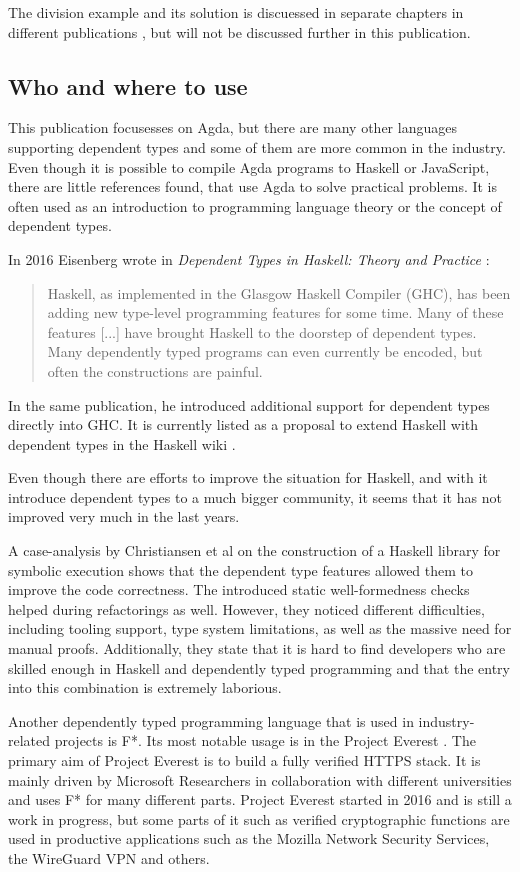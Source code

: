 The division example and its solution is discuessed in separate chapters in different publications \cite{10.1145/2841316, Bove2009}, but will not be discussed further in this publication.

\subsection{Who and where to use}
This publication focusesses on Agda, but there are many other languages supporting dependent types and some of them are more common in the industry.
Even though it is possible to compile Agda programs to Haskell or JavaScript, there are little references found, that use Agda to solve practical problems.
It is often used as an introduction to programming language theory or the concept of dependent types.

In 2016 Eisenberg wrote in \emph{Dependent Types in Haskell: Theory and Practice} \cite{DBLP:journals/corr/Eisenberg16}: 
\begin{quote}
Haskell, as implemented in the Glasgow Haskell Compiler (GHC), has been adding new type-level programming features for some time. Many of these features [...] have brought Haskell to the doorstep of dependent types. Many dependently typed programs can even currently be encoded, but often the constructions are painful.
\end{quote}

In the same publication, he introduced additional support for dependent types directly into GHC. It is currently listed as a proposal to extend Haskell with dependent types in the Haskell wiki \cite{haskell_wiki}.

Even though there are efforts to improve the situation for Haskell, and with it introduce dependent types to a much bigger community, it seems that it has not improved very much in the last years.

A case-analysis by Christiansen et al \cite{10.1145/3341704} on the construction of a Haskell library for symbolic execution shows that the dependent type features allowed them to improve the code correctness. 
The introduced static well-formedness checks helped during refactorings as well. 
However, they noticed different difficulties, including tooling support, type system limitations, as well as the massive need for manual proofs. 
Additionally, they state that it is hard to find developers who are skilled enough in Haskell and dependently typed programming and that the entry into this combination is extremely laborious.

Another dependently typed programming language that is used in industry-related projects is F*. 
Its most notable usage is in the Project Everest \cite{project_everest_github_io}. The primary aim of Project Everest is to build a fully verified HTTPS stack.
It is mainly driven by Microsoft Researchers in collaboration with different universities and uses F* for many different parts.
Project Everest started in 2016 and is still a work in progress, but some parts of it such as verified cryptographic functions are used in productive applications such as the Mozilla Network Security Services\cite{project_everest_slides}, the WireGuard VPN and others.
